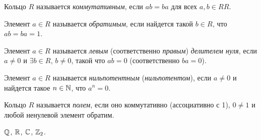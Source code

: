 \begin{definition}
    Кольцо $R$ называется \textit{коммутативным}, если $ab = ba$ для всех $a, b \in RR$.
\end{definition}

\begin{definition}
    Элемент $a \in R$ называется \textit{обратимым}, если найдется такой $b \in R$, что $ab = ba = 1$.
\end{definition}

\begin{comment}
    Все обратимые элементы кольца $R$ образуют группу по умножению.
\end{comment}

\begin{definition}
    Элемент $a \in R$ называется \textit{левым} (соответственно \textit{правым}) \textit{делителем нуля}, если $a \neq 0$ и $\exists b \in R$, $b \neq 0$, такой что $ab = 0$ (соответственно $ba = 0$).
\end{definition}

\begin{comment}
    Если $R$ коммутативно, то множества левых и правых делителей нуля совпадают. Тогда левые и правые делители нуля называются просто <<делителями нуля>>.
\end{comment}

\begin{comment}
    Все делители нуля в $R$ необратимы. Если $ab = 0$, $a \neq 0$, $b \neq 0$ и существует $a^{-1}$, то получаем $a^{-1} a b = a^{-1} 0$, откуда $b = 0$ --- противоречние.
\end{comment}

\begin{definition}
    Элемент $a \in R$ называется \textit{нильпотентным} (\textit{нильпотентом}), если $a \neq 0$ и найдется такое $n \in \mathbb{N}$, что $a^{n} = 0$.
\end{definition}

\begin{comment}
    Всякий нильпотент является делителем нуля: если $a \neq 0$ и $n$ минимально, то $a \cdot a^{n - 1} = 0$.
\end{comment}

\begin{definition}
    Кольцо $R$ называется \textit{полем}, если оно коммутативно (ассоциативно с 1), $0 \neq 1$ и любой ненулевой элемент обратим.
\end{definition}

\begin{example}
    $\mathbb{Q}$, $\mathbb{R}$, $\mathbb{C}$, $\mathbb{Z}_2$.
\end{example}

